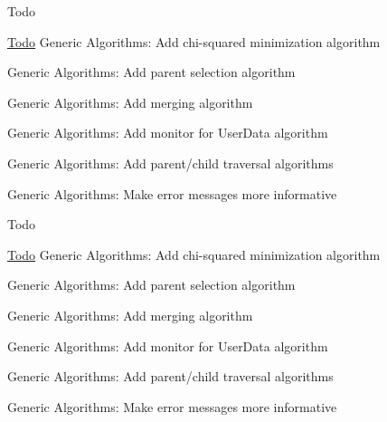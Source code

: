 \begin{DoxyRefDesc}{Todo}
\item[\hyperlink{todo__todo000009}{Todo}]Generic Algorithms\+: Add chi-\/squared minimization algorithm 

Generic Algorithms\+: Add parent selection algorithm 

Generic Algorithms\+: Add merging algorithm 

Generic Algorithms\+: Add monitor for User\+Data algorithm 

Generic Algorithms\+: Add parent/child traversal algorithms 

Generic Algorithms\+: Make error messages more informative \end{DoxyRefDesc}


\begin{DoxyRefDesc}{Todo}
\item[\hyperlink{todo__todo000010}{Todo}]Generic Algorithms\+: Add chi-\/squared minimization algorithm 

Generic Algorithms\+: Add parent selection algorithm 

Generic Algorithms\+: Add merging algorithm 

Generic Algorithms\+: Add monitor for User\+Data algorithm 

Generic Algorithms\+: Add parent/child traversal algorithms 

Generic Algorithms\+: Make error messages more informative \end{DoxyRefDesc}


